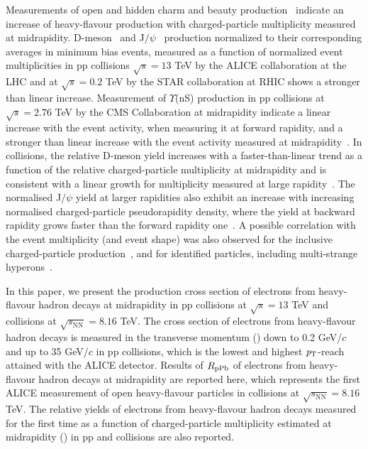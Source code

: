Measurements of open and hidden charm and beauty production~\cite{Adam:2015ota,Acharya:2020pit,Adam:2018jmp,Chatrchyan:2013nza,Acharya:2020giw,Adam:2016mkz} indicate an increase of heavy-flavour production with charged-particle multiplicity measured at midrapidity. D-meson~\cite{Adam:2015ota} and J$/\psi$~\cite{Acharya:2020pit,Adam:2018jmp} production normalized to their corresponding averages in minimum bias events, measured as a function of normalized event multiplicities in pp collisions $\sqrt{s} = 13$ TeV  by the ALICE collaboration at the LHC and at $\sqrt{s} = 0.2$ TeV by the STAR collaboration at RHIC shows a stronger than linear increase. Measurement of $\Upsilon$(nS) production in pp collisions at $\sqrt{s} = 2.76$ TeV by the CMS Collaboration at midrapidity indicate a linear increase with the event activity, when measuring it at forward rapidity, and a stronger than linear increase with the event activity measured at midrapidity~\cite{Chatrchyan:2013nza}. In \pPb collisions, the relative D-meson yield increases with a faster-than-linear trend as a function of the relative charged-particle multiplicity at midrapidity and is consistent with a linear growth for multiplicity measured at large rapidity~\cite{Adam:2016mkz}. The normalised J$/\psi$ yield at larger rapidities also exhibit an increase with increasing normalised charged-particle pseudorapidity density, where the yield at backward rapidity grows faster than the forward rapidity one~\cite{Acharya:2020giw}. A possible correlation with the event multiplicity (and event shape) was also observed for the inclusive charged-particle production~\cite{Acharya:2019mzb}, and for identified particles, including multi-strange hyperons~\cite{Acharya:2018orn}.

In this paper, we present the production cross section of electrons from heavy-flavour hadron decays at midrapidity in pp collisions at $\sqrt{s}=13$ TeV and \pPb collisions at $\sqrt{s_{\textrm{NN}}}=8.16$ TeV. The cross section of electrons from heavy-flavour hadron decays is measured in the transverse momentum (\pt) down to 0.2 GeV/$c$ and up to 35 GeV/$c$ in pp collisions, which is the lowest and highest ${\it p}_{\rm T}$-reach attained with the ALICE detector. %
Results of $R_{\rm{pPb}}$ of electrons from heavy-flavour hadron decays at midrapidity are reported here, which represents the first ALICE measurement of open heavy-flavour particles in \pPb collisions at $\sqrt{s_{\textrm{NN}}}=8.16$ TeV. The relative yields of electrons from heavy-flavour hadron decays measured for the first time as a function of charged-particle multiplicity estimated at midrapidity  () in pp and \pPb collisions are also reported. 

